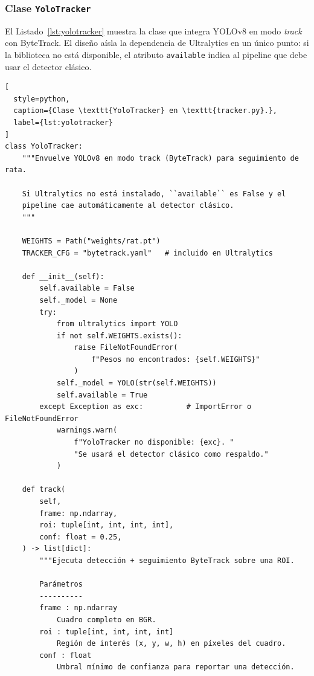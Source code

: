 
\subsubsection{Clase \texttt{YoloTracker}}

El Listado~\ref{lst:yolotracker} muestra la clase que integra YOLOv8 en modo
\textit{track} con ByteTrack. El diseño aísla la dependencia de Ultralytics
en un único punto: si la biblioteca no está disponible, el atributo
\texttt{available} indica al pipeline que debe usar el detector clásico.

\begin{lstlisting}[
  style=python,
  caption={Clase \texttt{YoloTracker} en \texttt{tracker.py}.},
  label={lst:yolotracker}
]
class YoloTracker:
    """Envuelve YOLOv8 en modo track (ByteTrack) para seguimiento de rata.

    Si Ultralytics no está instalado, ``available`` es False y el
    pipeline cae automáticamente al detector clásico.
    """

    WEIGHTS = Path("weights/rat.pt")
    TRACKER_CFG = "bytetrack.yaml"   # incluido en Ultralytics

    def __init__(self):
        self.available = False
        self._model = None
        try:
            from ultralytics import YOLO
            if not self.WEIGHTS.exists():
                raise FileNotFoundError(
                    f"Pesos no encontrados: {self.WEIGHTS}"
                )
            self._model = YOLO(str(self.WEIGHTS))
            self.available = True
        except Exception as exc:          # ImportError o FileNotFoundError
            warnings.warn(
                f"YoloTracker no disponible: {exc}. "
                "Se usará el detector clásico como respaldo."
            )

    def track(
        self,
        frame: np.ndarray,
        roi: tuple[int, int, int, int],
        conf: float = 0.25,
    ) -> list[dict]:
        """Ejecuta detección + seguimiento ByteTrack sobre una ROI.

        Parámetros
        ----------
        frame : np.ndarray
            Cuadro completo en BGR.
        roi : tuple[int, int, int, int]
            Región de interés (x, y, w, h) en píxeles del cuadro.
        conf : float
            Umbral mínimo de confianza para reportar una detección.


\end{lstlisting}

